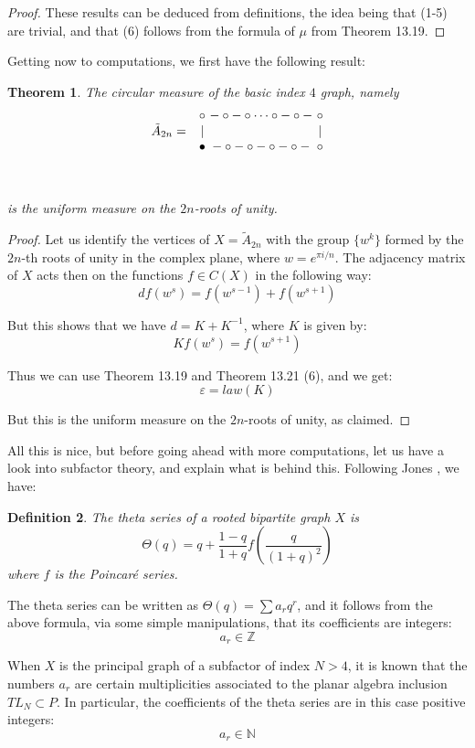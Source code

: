 \documentclass[12pt]{amsbook}
\newtheorem{theorem}{Theorem}[chapter]
\newtheorem{definition}[theorem]{Definition}
\begin{document}
\begin{proof}
These results can be deduced from definitions, the idea being that (1-5) are trivial, and that (6) follows from the formula of $\mu$ from Theorem 13.19.
\end{proof}

Getting now to computations, we first have the following result:

\begin{theorem}
The circular measure of the basic index $4$ graph, namely 
$$\begin{matrix}
&\circ&\!\!\!\!-\circ-\circ\cdots\circ-\circ-&\!\!\!\!\circ\cr
\tilde{A}_{2n}=&|&&\!\!\!\!|\cr
&\bullet&\!\!\!\!-\circ-\circ-\circ-\circ-&\!\!\!\!\circ\cr\cr\cr\end{matrix}$$
\vskip-7mm

\noindent is the uniform measure on the $2n$-roots of unity.
\end{theorem}

\begin{proof}
Let us identify the vertices of $X=\tilde{A}_{2n}$ with the group $\{w^k\}$ formed by the $2n$-th roots of unity in the complex plane, where $w=e^{\pi i/n}$. The adjacency matrix of $X$ acts then on the functions $f\in C(X)$ in the following way:
$$df(w^s)=f(w^{s-1})+f(w^{s+1})$$

But this shows that we have $d=K+K^{-1}$, where $K$ is given by:
$$Kf(w^s)=f(w^{s+1})$$

Thus we can use Theorem 13.19 and Theorem 13.21 (6), and we get:
$$\varepsilon=law(K)$$

But this is the uniform measure on the $2n$-roots of unity, as claimed.
\end{proof}

All this is nice, but before going ahead with more computations, let us have a look into subfactor theory, and explain what is behind this. Following Jones \cite{jon}, we have:

\begin{definition}
The theta series of a rooted bipartite graph $X$ is
$$\Theta(q)=q+\frac{1-q}{1+q}f\left(\frac{q}{(1+q)^2}\right)$$
where $f$ is the Poincar\'e series.
\end{definition}

The theta series can be written as $\Theta(q)=\sum a_rq^r$, and it follows from the above formula, via some simple manipulations, that its coefficients are integers:
$$a_r\in\mathbb Z$$

When $X$ is the principal graph of a subfactor of index $N>4$, it is known that the numbers $a_r$ are certain multiplicities associated to the planar algebra inclusion $TL_N\subset P$. In particular, the coefficients of the theta series are in this case positive integers:
$$a_r\in\mathbb N$$
\end{document}
